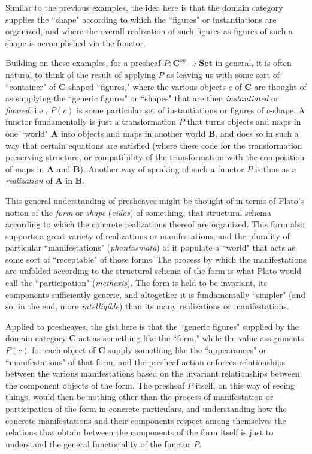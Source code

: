\documentclass[11pt]{book}
\theoremstyle{definition}
\theoremstyle{definition}
\theoremstyle{definition}
\theoremstyle{theorem}
\theoremstyle{definition}
\begin{document}
Similar to the previous examples, the idea here is that the domain category supplies the ``shape" according to which the ``figures" or instantiations are organized, and where the overall realization of such figures as figures of such a shape is accomplished via the functor. \par 
Building on these examples, for a presheaf $P: \textbf{C}^{op} \rightarrow \textbf{Set}$ in general, it is often natural to think of the result of applying $P$ as leaving us with some sort of ``container" of $\textbf{C}$-shaped ``figures," where the various objects $c$ of \textbf{C} are thought of as supplying the ``generic figures" or ``shapes" that are then \textit{instantiated} or \textit{figured}, i.e., $P(c)$ is some particular set of instantiations or figures of $c$-shape. 
A functor fundamentally is just a transformation $P$ that turns objects and maps in one ``world" $\textbf{A}$ into objects and maps in another world $\textbf{B}$, and does so in such a way that certain equations are satisfied (where these code for the transformation preserving structure, or compatibility of the transformation with the composition of maps in $\textbf{A}$ and $\textbf{B}$). Another way of speaking of such a functor $P$ is thus as a \textit{realization} of $\textbf{A}$ in $\textbf{B}$. \par   
This general understanding of presheaves might be thought of in terms of Plato's notion of the \textit{form} or \textit{shape} (\textit{eidos}) of something, that structural schema according to which the concrete realizations thereof are organized. This form also supports a great variety of realizations or manifestations, and the plurality of particular ``manifestations" (\textit{phantasmata}) of it populate a ``world" that acts as some sort of ``receptable" of those forms. The process by which the manifestations are unfolded according to the structural schema of the form is what Plato would call the ``participation" (\textit{methexis}). The form is held to be invariant, its components sufficiently generic, and altogether it is fundamentally ``simpler" (and so, in the end, more \textit{intelligible}) than its many realizations or manifestations. \par 
Applied to presheaves, the gist here is that the ``generic figures" supplied by the domain category \textbf{C} act as something like the ``form," while the value assignments $P(c)$ for each object of \textbf{C} supply something like the ``appearances" or ``manifestations" of that form, and the presheaf action enforces relationships between the various manifestations based on the invariant relationships between the component objects of the form. The presheaf $P$ itself, on this way of seeing things, would then be nothing other than the process of manifestation or participation of the form in concrete particulars, and understanding how the concrete manifestations and their components respect among themselves the relations that obtain between the components of the form itself is just to understand the general functoriality of the functor $P$.  
\end{document}
